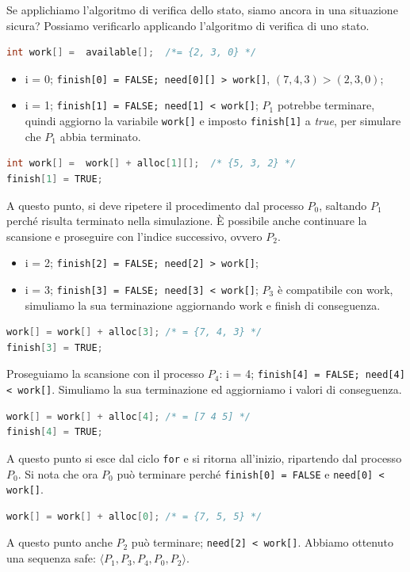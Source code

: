 \documentclass[a4paper,12pt, twoside]{report}
\begin{document}
Se applichiamo l'algoritmo di verifica dello stato, siamo ancora in una situazione sicura? Possiamo verificarlo applicando l'algoritmo di verifica di uno stato.
\begin{lstlisting}[language=C]
int work[] =  available[]; 	/*= {2, 3, 0} */
\end{lstlisting}
\begin{itemize}
\item i = 0; \texttt{finish[0] = FALSE; need[0][]  > work[]},  $(7, 4, 3) > (2, 3, 0)$;
\item i = 1; \texttt{finish[1] = FALSE; need[1] < work[]}; $P_1$ potrebbe terminare, quindi aggiorno la variabile \texttt{work[]} e imposto \texttt{finish[1]} a \emph{true}, per simulare che $P_1$ abbia terminato.
\end{itemize}
\begin{lstlisting}[language=C]
int work[] =  work[] + alloc[1][]; 	/* {5, 3, 2} */
finish[1] = TRUE;
\end{lstlisting}
A questo punto, si deve ripetere il procedimento dal processo $P_0$, saltando $P_1$ perch\'e risulta terminato nella simulazione. \`E possibile anche continuare la scansione e proseguire con l'indice successivo, ovvero $P_2$.
\begin{itemize}
\item i = 2; \texttt{finish[2] = FALSE; need[2] > work[]};
\item i = 3; \texttt{finish[3] = FALSE; need[3] < work[]}; $P_3$ \`e compatibile con work, simuliamo la sua terminazione aggiornando work e finish di conseguenza.
\end{itemize}
\begin{lstlisting}[language=C]
work[] = work[] + alloc[3];	/* = {7, 4, 3} */
finish[3] = TRUE;
\end{lstlisting}
Proseguiamo la scansione con il processo $P_4$: i = 4; \texttt{finish[4] = FALSE; need[4] < work[]}. Simuliamo la sua terminazione ed aggiorniamo i valori di conseguenza. 
\begin{lstlisting}[language=C]
work[] = work[] + alloc[4]; /* = [7 4 5] */
finish[4] = TRUE;
\end{lstlisting}
A questo punto si esce dal ciclo \texttt{for} e si ritorna all'inizio, ripartendo dal processo $P_0$. Si nota che ora $P_0$ pu\`o terminare perch\'e \texttt{finish[0] = FALSE} e \texttt{need[0] < work[]}.
\begin{lstlisting}[language=C]
work[] = work[] + alloc[0]; /* = {7, 5, 5} */
\end{lstlisting}
A questo punto anche $P_2$ pu\`o terminare; \texttt{need[2] < work[]}.
Abbiamo ottenuto una sequenza safe: $\langle P_1, P_3, P_4, P_0, P_2 \rangle$.
\end{document}
